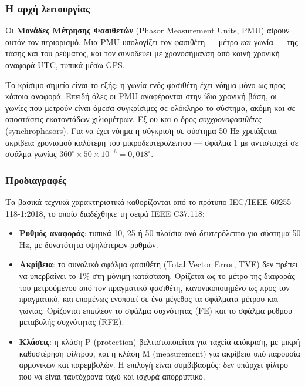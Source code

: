 \subsubsection*{Η αρχή λειτουργίας}

Οι \textbf{Μονάδες Μέτρησης Φασιθετών} (Phasor Measurement Units, PMU) αίρουν αυτόν τον
περιορισμό. Μια PMU υπολογίζει τον φασιθέτη — μέτρο \emph{και} γωνία — της τάσης και του
ρεύματος, και τον συνοδεύει με χρονοσήμανση από κοινή χρονική αναφορά UTC, τυπικά μέσω GPS.

Το κρίσιμο σημείο είναι το εξής: η γωνία ενός φασιθέτη έχει νόημα μόνο ως προς κάποια
αναφορά. Επειδή όλες οι PMU αναφέρονται στην ίδια χρονική βάση, οι γωνίες που μετρούν είναι
άμεσα συγκρίσιμες σε ολόκληρο το σύστημα, ακόμη και σε αποστάσεις εκατοντάδων χιλιομέτρων.
Εξ ου και ο όρος \emph{συγχρονοφασιθέτες} (synchrophasors). Για να έχει νόημα η σύγκριση σε
σύστημα 50 Hz χρειάζεται ακρίβεια χρονισμού καλύτερη του μικροδευτερολέπτου — σφάλμα 1 μs
αντιστοιχεί σε σφάλμα γωνίας $360^\circ \times 50 \times 10^{-6} = 0{,}018^\circ$.

\subsubsection*{Προδιαγραφές}

Τα βασικά τεχνικά χαρακτηριστικά καθορίζονται από το πρότυπο IEC/IEEE 60255-118-1:2018, το
οποίο διαδέχθηκε τη σειρά IEEE C37.118:

\begin{itemize}
\item \textbf{Ρυθμός αναφοράς}: τυπικά 10, 25 ή 50 πλαίσια ανά δευτερόλεπτο για σύστημα
      50 Hz, με δυνατότητα υψηλότερων ρυθμών.
\item \textbf{Ακρίβεια}: το συνολικό σφάλμα φασιθέτη (Total Vector Error, TVE) δεν πρέπει
      να υπερβαίνει το 1\% στη μόνιμη κατάσταση. Ορίζεται ως το μέτρο της διαφοράς του
      μετρούμενου από τον πραγματικό φασιθέτη, κανονικοποιημένο ως προς τον πραγματικό, και
      επομένως ενοποιεί σε ένα μέγεθος τα σφάλματα μέτρου και γωνίας. Ορίζονται επιπλέον
      το σφάλμα συχνότητας (FE) και το σφάλμα ρυθμού μεταβολής συχνότητας (RFE).
\item \textbf{Κλάσεις}: η κλάση P (protection) βελτιστοποιείται για ταχεία απόκριση, με
      μικρή καθυστέρηση φίλτρου, και η κλάση M (measurement) για ακρίβεια υπό παρουσία
      αρμονικών και παρεμβολών. Η επιλογή είναι συμβιβασμός: δεν υπάρχει φίλτρο που να
      είναι ταυτόχρονα ταχύ και ισχυρά απορριπτικό.
\end{itemize}

